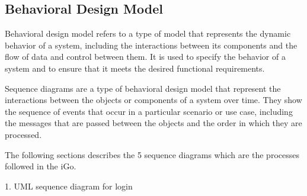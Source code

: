 \documentclass[a4paper,12pt]{article}
\begin{document}
\subsection{Behavioral Design Model}
Behavioral design model refers to a type of model that represents the dynamic behavior of a system, including the interactions between its components and the flow of data and control between them. It is used to specify the behavior of a system and to ensure that it meets the desired functional requirements.\\ \par

Sequence diagrams are a type of behavioral design model that represent the interactions between the objects or components of a system over time. They show the sequence of events that occur in a particular scenario or use case, including the messages that are passed between the objects and the order in which they are processed. \\ \par

The following sections describes the 5 sequence diagrams which are the processes followed in the iGo.

\begin{center}
\caption{1. UML sequence diagram for login}
\end{center}
\end{document}
